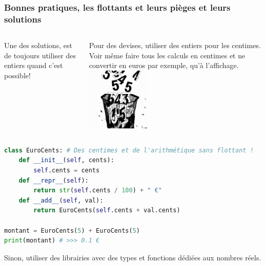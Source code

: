 \documentclass{beamer}
\begin{document}
    \begin{frame}[fragile]
        \transdissolve
        \frametitle{Bonnes pratiques, les flottants et leurs pièges et leurs solutions}

        \begin{columns}
            Une des solutions, est de toujours utiliser des entiers quand c'est possible!

            Pour des devises, utiliser des entiers pour les centimes.
            Voir même faire tous les calculs en centimes et ne convertir en euros par exemple, qu'à l'affichage.
            \centering
            \includegraphics[width=3cm]{image/numbers-throwned-in-the-trash.png}

        \end{columns}
        \begin{lstlisting}[language=python]
class EuroCents: # Des centimes et de l'arithmétique sans flottant !
    def __init__(self, cents):
        self.cents = cents
    def __repr__(self):
        return str(self.cents / 100) + " €"
    def __add__(self, val):
        return EuroCents(self.cents + val.cents)

montant = EuroCents(5) + EuroCents(5)
print(montant) # >>> 0.1 €
        \end{lstlisting}

        Sinon, utiliser des librairies avec des types et fonctions dédiées aux nombres réels.
    \end{frame}
\end{document}

